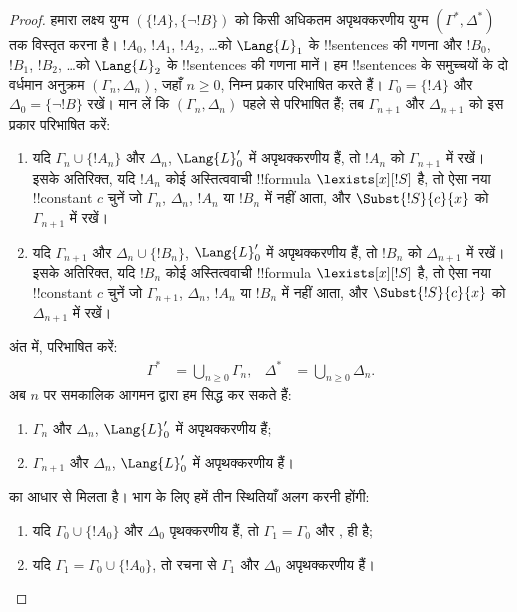 \documentclass[../../../include/open-logic-section]{subfiles}
\begin{document}
\begin{proof}
हमारा लक्ष्य युग्म $(\{ !A \}, \{\lnot!B\})$ को किसी अधिकतम
अपृथक्करणीय युग्म $(\Gamma^*, \Delta^*)$ तक विस्तृत करना है। $!A_0$,
$!A_1$, $!A_2$, \dots को $\Lang{L}_1$ के !!{sentence}s की गणना और
$!B_0$, $!B_1$, $!B_2$, \dots को $\Lang{L}_2$ के !!{sentence}s की
गणना मानें। हम !!{sentence}s के समुच्चयों के दो वर्धमान अनुक्रम
$(\Gamma_n, \Delta_n)$, जहाँ $n \ge 0$, निम्न प्रकार परिभाषित करते हैं।
$\Gamma_0 = \{ !A\}$ और $\Delta_0 = \{\lnot !B \}$ रखें। मान लें कि
$(\Gamma_n, \Delta_n)$ पहले से परिभाषित हैं; तब $\Gamma_{n+1}$ और
$\Delta_{n+1}$ को इस प्रकार परिभाषित करें:
\begin{enumerate}
\item यदि $\Gamma_n \cup \{!A_n \}$ और $\Delta_n$, $\Lang{L}'_0$ में
  अपृथक्करणीय हैं, तो $!A_n$ को $\Gamma_{n+1}$ में रखें। इसके अतिरिक्त,
  यदि $!A_n$ कोई अस्तित्ववाची !!{formula} $\lexists[x][!S]$ है, तो ऐसा
  नया !!{constant} $c$ चुनें जो $\Gamma_n$, $\Delta_n$, $!A_n$ या
  $!B_n$ में नहीं आता, और $\Subst{!S}{c}{x}$ को $\Gamma_{n+1}$ में रखें।
\item यदि $\Gamma_{n+1}$ और $\Delta_n \cup \{!B_n \}$,
  $\Lang{L}'_0$ में अपृथक्करणीय हैं, तो $!B_n$ को $\Delta_{n+1}$ में
  रखें। इसके अतिरिक्त, यदि $!B_n$ कोई अस्तित्ववाची !!{formula}
  $\lexists[x][!S]$ है, तो ऐसा नया !!{constant} $c$ चुनें जो
  $\Gamma_{n+1}$, $\Delta_n$, $!A_n$ या $!B_n$ में नहीं आता, और
  $\Subst{!S}{c}{x}$ को $\Delta_{n+1}$ में रखें।
\end{enumerate}
अंत में, परिभाषित करें:
\begin{align*}
  \Gamma^* & = \bigcup_{n\ge 0} \Gamma_n, & 
  \Delta^* & = \bigcup_{n\ge 0} \Delta_n.
\end{align*}
अब $n$ पर समकालिक आगमन द्वारा हम सिद्ध कर सकते हैं:
\begin{enumerate}
\item{} $\Gamma_n$ और $\Delta_n$, $\Lang{L}'_0$ में
  अपृथक्करणीय हैं;
\item{} $\Gamma_{n+1}$ और $\Delta_n$, $\Lang{L}'_0$ में
    अपृथक्करणीय हैं।
\end{enumerate}
 का आधार  से मिलता है। भाग
 के लिए हमें तीन स्थितियाँ अलग करनी होंगी:
\begin{enumerate}
\item यदि $\Gamma_0 \cup \{!A_0 \}$ और $\Delta_0$ पृथक्करणीय हैं, तो
  $\Gamma_1 = \Gamma_0$ और ,  ही है;
\item यदि $\Gamma_1 = \Gamma_0 \cup\{ !A_0\}$, तो रचना से $\Gamma_1$
  और $\Delta_0$ अपृथक्करणीय हैं।

\end{enumerate}
\end{proof}
\end{document}
